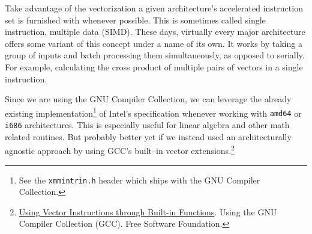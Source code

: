 Take advantage of the vectorization a given architecture's accelerated instruction set is furnished with whenever possible. This is sometimes called single instruction, multiple data (SIMD). These days, virtually every major architecture offers some variant of this concept under a name of its own. It works by taking a group of inputs and batch processing them simultaneously, as opposed to serially. For example, calculating the cross product of multiple pairs of vectors in a single instruction.

Since we are using the GNU Compiler Collection, we can leverage the already existing implementation\footnote{See the {\tt xmmintrin.h} header which ships with the GNU Compiler Collection.} of Intel's specification whenever working with {\tt amd64} or {\tt i686} architectures. This is especially useful for linear algebra and other math related routines. But probably better yet if we instead used an architecturally agnostic approach by using GCC's built--in vector extensions.\footnote
{\href{http://gcc.gnu.org/onlinedocs/gcc/Vector-Extensions.html}{Using Vector Instructions through Built-in Functions}. Using the GNU Compiler Collection (GCC). Free Software Foundation.}


